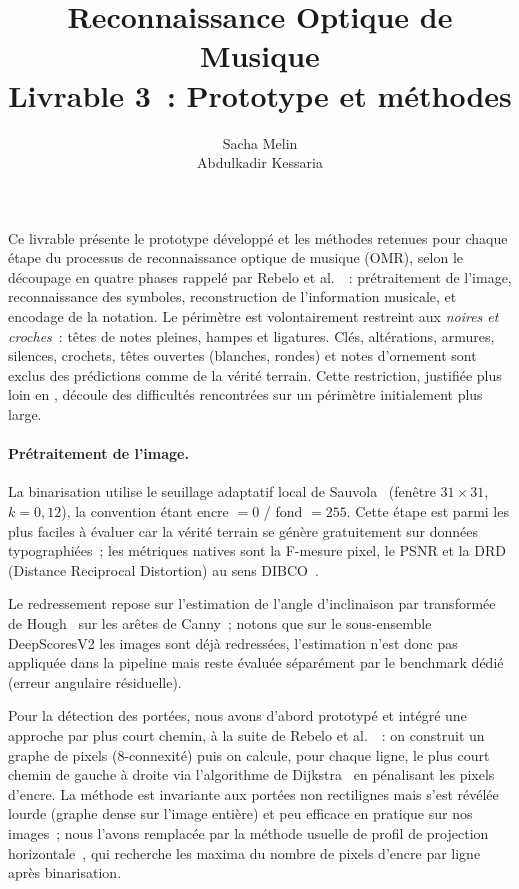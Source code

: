 \documentclass[a4paper,10pt]{article}
\title{\vspace{-1.5cm}\textbf{Reconnaissance Optique de Musique \\ \large Livrable 3~: Prototype et méthodes}}
\author{Sacha Melin \\ Abdulkadir Kessaria}
\date{}
\begin{document}
\maketitle

Ce livrable présente le prototype développé et les méthodes retenues pour chaque étape du processus de reconnaissance optique de musique (OMR), selon le découpage en quatre phases rappelé par Rebelo et al.~\cite{Rebelo2012-jn}~: prétraitement de l'image, reconnaissance des symboles, reconstruction de l'information musicale, et encodage de la notation. Le périmètre est volontairement restreint aux \emph{noires et croches}~: têtes de notes pleines, hampes et ligatures. Clés, altérations, armures, silences, crochets, têtes ouvertes (blanches, rondes) et notes d'ornement sont exclus des prédictions comme de la vérité terrain. Cette restriction, justifiée plus loin en , découle des difficultés rencontrées sur un périmètre initialement plus large.

\paragraph{Prétraitement de l'image.}
La binarisation utilise le seuillage adaptatif local de Sauvola~\cite{sauvola2000adaptive} (fenêtre $31\times31$, $k=0{,}12$), la convention étant encre $=0$ / fond $=255$. Cette étape est parmi les plus faciles à évaluer car la vérité terrain se génère gratuitement sur données typographiées~; les métriques natives sont la F-mesure pixel, le PSNR et la DRD (Distance Reciprocal Distortion) au sens DIBCO~\cite{dibco2011,lu2004drd}.

Le redressement repose sur l'estimation de l'angle d'inclinaison par transformée de Hough~\cite{BALLARD1981111} sur les arêtes de Canny~; notons que sur le sous-ensemble DeepScoresV2 les images sont déjà redressées, l'estimation n'est donc pas appliquée dans la pipeline mais reste évaluée séparément par le benchmark dédié (erreur angulaire résiduelle).

Pour la détection des portées, nous avons d'abord prototypé et intégré une approche par plus court chemin, à la suite de Rebelo et al.~\cite{4402863}~: on construit un graphe de pixels (8-connexité) puis on calcule, pour chaque ligne, le plus court chemin de gauche à droite via l'algorithme de Dijkstra~\cite{dijkstra1959} en pénalisant les pixels d'encre. La méthode est invariante aux portées non rectilignes mais s'est révélée lourde (graphe dense sur l'image entière) et peu efficace en pratique sur nos images~; nous l'avons remplacée par la méthode usuelle de profil de projection horizontale~\cite{Blostein1992}, qui recherche les maxima du nombre de pixels d'encre par ligne après binarisation.
\end{document}
